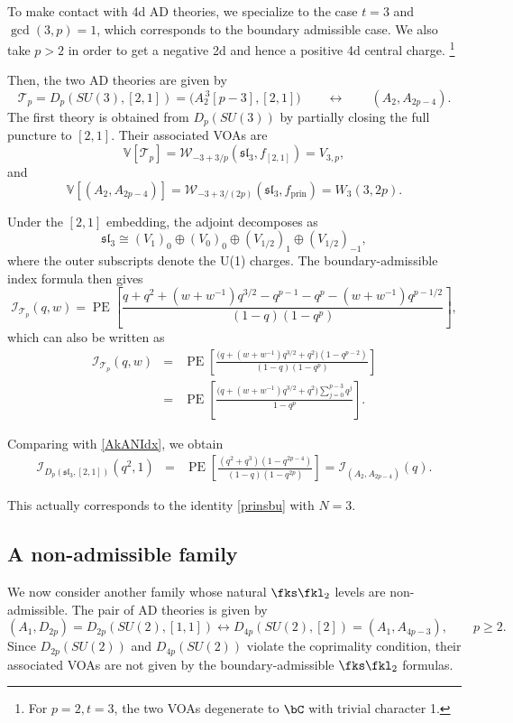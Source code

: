 \documentclass[a4paper,11pt]{article}
\theoremstyle{definition}
\theoremstyle{definition}
\theoremstyle{remark}
\newcommand{\be}{\begin{equation}}
\newcommand{\ee}{\end{equation}}
\newcommand{\beqn}{\begin{eqnarray}}
\newcommand{\eeqn}{\end{eqnarray}}
\begin{document}
    
     
    To make contact with 4d AD theories, we   specialize to the  case $t=3$ and $\gcd(3,p)=1$, which corresponds to the boundary admissible case.
We   also   take $p>2$ in order to get a negative 2d and hence a positive 4d   central charge. 
\footnote{For $p=2,t=3$, the two VOAs degenerate  to $\bC$ with trivial character 1. }

Then, the two AD theories are given by 
\be 
\mathcal T_p
=
D_p(SU(3),[2,1])
=
\bigl(A_2^{\,3}[p-3],[2,1]\bigr) \qquad\leftrightarrow \qquad 
(A_2,A_{2p-4}).
\ee
The first theory   is obtained from  $ D_p(SU(3))$ by partially closing the full puncture to $ [2,1]$.
Their  associated VOAs are
\be  
\mathbb V[\mathcal T_p]
=
\mathcal W_{-3+3/p}(\mathfrak{sl}_3,f_{[2,1]}) =V_{3,p},
\ee
and
\be  
\mathbb V[(A_2,A_{2p-4})]
=
\mathcal W_{-3+3/(2p)}(\mathfrak{sl}_3,f_{\mathrm{prin}})
=
W_3(3,2p). 
\ee
 
 
 
Under the $[2,1]$ embedding,  the adjoint decomposes as 
\be 
 \mathfrak{sl}_3
\cong
(V_1)_0\oplus (V_0)_0\oplus (V_{1/2})_1 \oplus (V_{1/2})_{-1},
\ee
where the outer subscripts denote  the U(1) charges. 
The boundary-admissible index formula then gives
  \be  
 {\mathcal I}_{\mathcal T_p}(q,w)
=
\operatorname{PE}\!\left[
\frac{
q+q^2+(w+w^{-1})q^{3/2}
-q^{p-1}-q^p-(w+w^{-1})q^{p-1/2}
}
{(1-q)(1-q^p)}
\right], 
\ee  
which can also be written as
  \beqn
\mathcal I_{\mathcal T_p}(q,w)
&=&\operatorname{PE}\!\left[
\frac{\bigl(q+(w+w^{-1})q^{3/2}+q^2\bigr)(1-q^{p-2})}
{(1-q)(1-q^p)}\right]\nonumber\\
&=&\operatorname{PE}\!\left[
\frac{\bigl(q+(w+w^{-1})q^{3/2}+q^2\bigr)
\sum_{j=0}^{p-3}q^j}{1-q^p}\right].
\eeqn 



 
 


 Comparing with \eqref{AkANIdx}, we obtain 
\beqn\label{BPfsfsf}
\mathcal I_{D_p(\mathfrak{sl}_3,[2,1])}(q^2,1) &=& \operatorname{PE}\!\left[
\frac{
(q^2+q^3)(1-q^{2p-4})
}
{(1-q)(1-q^{2p})}
\right]
=
\mathcal I_{(A_2,A_{2p-4})}(q) .
\eeqn
 
 This actually corresponds to the  identity  \eqref{prinsbu} with $N=3$.
   
   \subsection{A  non-admissible  family}\label{nonadm}
   We now consider another  family whose natural $\fks\fkl_2$ levels are non-admissible.
    The pair of AD theories is given by 
\be   
(A_1,D_{2p}) =D_{2p}(SU(2), [1,1])\longleftrightarrow D_{4p}(SU(2),[2])=(A_1,A_{4p-3}),
\qquad p\ge2.
\ee
Since $D_{2p}(SU(2))$ and $ D_{4p}(SU(2))$ violate  the coprimality condition, their associated VOAs
are not given by the boundary-admissible $\fks\fkl_2$ formulas.
\end{document}
